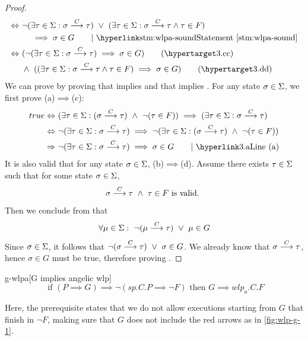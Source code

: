 \begin{proof}
\begin{align*}
	\Leftrightarrow&\  \neg(\exists \tau\in\S: \sigma\goto{C}\tau) \ \vee\ 
	(\exists \tau\in\S: \sigma\goto{C}\tau\wedge  \tau\in F)\\
	&\ \ \ \ \implies \sigma\in G \tag*{$\mid$ \stm{wlpa-sound}}\\
	\Leftrightarrow&\  (\neg(\exists \tau\in\S: \sigma\goto{C}\tau)\implies \sigma\in G ) \tag{\lblth{c}}\\
	&\ \wedge\ ((\exists \tau\in\S: \sigma\goto{C}\tau\wedge  \tau\in F)\implies\sigma\in G) \tag{\lblth{d}}\\
\end{align*}
We can prove  by proving that  implies  and that  implies .
For any state $\sigma\in\S$, we first prove (a)$\implies$(c):
\begin{align*}
	true 
	\Leftrightarrow&\ (\exists\tau\in\S:(\sigma\goto{C}\tau)\ \wedge\ \neg(\tau\in F)) \implies (\exists\tau\in\S:\sigma\goto{C}\tau)\\ 
	\Leftrightarrow&\ \neg(\exists\tau\in\S:\sigma\goto{C}\tau) \implies \neg(\exists\tau\in\S:(\sigma\goto{C}\tau)\ \wedge\ \neg(\tau\in F))  \\ 
	\Rightarrow&\ \neg(\exists\tau\in\S:\sigma\goto{C}\tau) \implies \sigma\in G \tag*{$\mid$ \refth{a}}\\
\end{align*}
It is also valid that for any state $\sigma\in\S$, (b)$\implies$(d). 
Assume there exists $\tau\in\S$ such that for some state $\sigma\in\S$, 
$$\sigma\goto{C}\tau\ \wedge\  \tau\in F \text{ is valid. }$$
Then we conclude from  that 
$$\forall \mu\in\S:\ \neg (\mu\goto{C}\tau)\ \vee\ \mu\in G$$
Since $\sigma\in\S$, it follows that $\neg(\sigma\goto{C}\tau)\ \vee\ \sigma\in G$. 
We already know that $\sigma\goto{C}\tau$, hence $\sigma\in G$ must be true, therefore proving . 
\end{proof}


\begin{lemma}{g-wlpa}[G implies angelic wlp]
\ \\ \vspace{-3mm}
	\[%
	\text{ if \ \ \ \ } 
	(P{\implies} G) \implies \neg(sp.C.P {\implies} \neg F)
	\text{\ \ \ \  then\ \ \ \  } 
	G {\implies} wlp_a.C.F
	\] 
\end{lemma}
Here, the prerequisite states that we do not allow executions starting from $G$ that  finish in $\neg F$, making sure that $G$ does not include the red arrows as in \autoref{fig:wlp-g-1}.  

